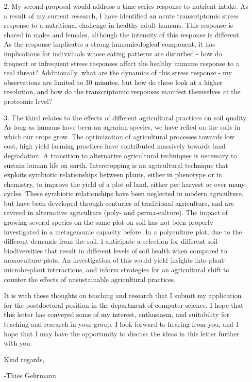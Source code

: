 \documentclass[letterpaper, 10pt]{article} %
\begin{document}
\begin{tcolorbox}[
	blanker,
	width=0.95\textwidth,
	enlarge left by=0.025\textwidth,
	enlarge right by=0.025\textwidth,
	before skip=6pt,
	breakable]
2. My second proposal would address a time-series response to nutrient intake. As a result of my current research, I have identified an acute transcriptomic stress response to a nutritional challenge in healthy adult humans. This response is shared in males and females, although the intensity of this response is different. As the response implicates a strong immunicological component, it has implications for individuals whose eating patterns are disturbed - how do frequent or infrequent stress responses affect the healthy immune response to a real threat? Additionally, what are the dynamics of this stress response - my observations are limited to 30 minutes, but how do these look at a higher resolution, and how do the transcriptomic responses manifest themselves at the proteomic level?

3. The third relates to the effects of different agricultural practices on soil quality. As long as humans have been an agrarian species, we have relied on the soils in which our crops grow. The optimization of agricultural processes towards low cost, high yield farming practices have contributed massively towards land degradation. A transition to alternative agricultural techniques is necessary to sustain human life on earth. Intercropping is an agricultural technique that exploits symbiotic relationships between plants, either in phenotype or in chemistry, to improve the yield of a plot of land, either per harvest or over many cycles. These symbiotic relationships have been neglected in modern agriculture, but have been developed through centuries of traditional agriculture, and are revived in alternative agriculture (poly- and perma-culture). The impact of growing several species on the same plot on soil has not been properly investigated in a metagenomic capacity before. In a polyculture plot, due to the different demands from the soil, I anticipate a selection for different soil biodiversities that result in different levels of soil health when compared to monoculture plots. An investigation of this would yield insights into plant-microbe-plant interactions, and inform strategies for an agricultural shift to counter the effects of unsustainable agricultural practices.

It is with these thoughts on teaching and research that I submit my application for the postdoctoral position in the department of computer science.
I hope that this letter has conveyed some of my interest, enthusiasm, and suitability for teaching and research in your group. I look forward to hearing from you, and I hope that I may have the opportunity to discuss the ideas in this letter further with you.


Kind regards,

-Thies Gehrmann
\end{tcolorbox}



\thispagestyle{empty}
\end{document}
